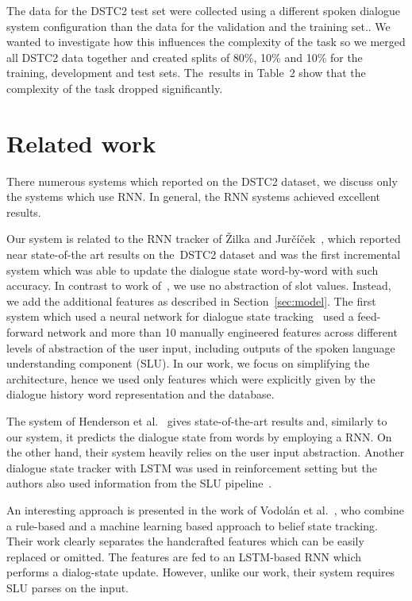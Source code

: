 \documentclass{itatnew}
\begin{document}
The data for the DSTC2 test set were collected using a different spoken dialogue system configuration than the data for the validation and the training set.\cite{henderson2014second}.
We wanted to investigate how this influences the complexity of the task so we merged all DSTC2 data together and created splits of 80\%, 10\% and 10\% for the training, development and test sets.
The~results in Table~2 show that the complexity of the task dropped significantly.


\section{Related work}
\label{sec:related}

There numerous systems which reported on the DSTC2 dataset, we discuss only the systems which use RNN.
In general, the RNN systems achieved excellent results.

Our system is related to the RNN tracker of Žilka and Jurčíček~\cite{zilka2015incremental},
which reported near state-of-the art results on the~DSTC2 dataset and was the first incremental system which was able to update the dialogue state word-by-word with such accuracy.
In contrast to work of~\cite{zilka2015incremental}, we use no abstraction of slot values. Instead, we add the additional features as described in Section~\ref{sec:model}.
The first system which used a neural network for dialogue state tracking~\cite{henderson2013deep} used a feed-forward network and more than 10 manually engineered features across different levels of abstraction of the user input, including outputs of the spoken language understanding component (SLU).
In our work, we focus on simplifying the architecture, hence we used only features which were explicitly given by the dialogue history word representation and the database.

The system of Henderson et al.~\cite{henderson2014word} gives state-of-the-art results and, similarly to our system, it predicts the dialogue state from words by employing a RNN.
On the other hand, their system heavily relies on the user input abstraction.
Another dialogue state tracker with LSTM was used in reinforcement setting but the authors also used information from the SLU pipeline~\cite{lee2016dialog}.

An interesting approach is presented in the work of Vodolán et al.~\cite{vodolan2015hybrid}, who combine a rule-based and a machine learning based approach to belief state tracking.
Their work clearly separates the handcrafted features which can be easily replaced or omitted.
The features are fed to an LSTM-based RNN which performs a dialog-state update.
However, unlike our work, their system requires SLU parses on the input.
\end{document}
